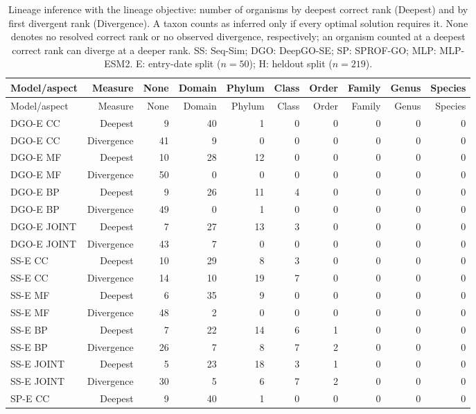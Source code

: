 \begingroup\scriptsize
\setlength{\tabcolsep}{4pt}
\begin{longtable}{lrrrrrrrrr}
\caption{Lineage inference with the lineage objective: number of organisms by deepest correct rank (Deepest) and by first divergent rank (Divergence). A taxon counts as inferred only if every optimal solution requires it. None denotes no resolved correct rank or no observed divergence, respectively; an organism counted at a deepest correct rank can diverge at a deeper rank. SS: Seq-Sim; DGO: DeepGO-SE; SP: SPROF-GO; MLP: MLP-ESM2. E: entry-date split ($n=50$); H: heldout split ($n=219$).}\label{tab:supp-lineage}\\
\toprule
Model/aspect & Measure & None & Domain & Phylum & Class & Order & Family & Genus & Species \\
\midrule
\endfirsthead
\toprule
Model/aspect & Measure & None & Domain & Phylum & Class & Order & Family & Genus & Species \\
\midrule
\endhead
DGO-E CC & Deepest & 9 & 40 & 1 & 0 & 0 & 0 & 0 & 0 \\
DGO-E CC & Divergence & 41 & 9 & 0 & 0 & 0 & 0 & 0 & 0 \\
DGO-E MF & Deepest & 10 & 28 & 12 & 0 & 0 & 0 & 0 & 0 \\
DGO-E MF & Divergence & 50 & 0 & 0 & 0 & 0 & 0 & 0 & 0 \\
DGO-E BP & Deepest & 9 & 26 & 11 & 4 & 0 & 0 & 0 & 0 \\
DGO-E BP & Divergence & 49 & 0 & 1 & 0 & 0 & 0 & 0 & 0 \\
DGO-E JOINT & Deepest & 7 & 27 & 13 & 3 & 0 & 0 & 0 & 0 \\
DGO-E JOINT & Divergence & 43 & 7 & 0 & 0 & 0 & 0 & 0 & 0 \\
SS-E CC & Deepest & 10 & 29 & 8 & 3 & 0 & 0 & 0 & 0 \\
SS-E CC & Divergence & 14 & 10 & 19 & 7 & 0 & 0 & 0 & 0 \\
SS-E MF & Deepest & 6 & 35 & 9 & 0 & 0 & 0 & 0 & 0 \\
SS-E MF & Divergence & 48 & 2 & 0 & 0 & 0 & 0 & 0 & 0 \\
SS-E BP & Deepest & 7 & 22 & 14 & 6 & 1 & 0 & 0 & 0 \\
SS-E BP & Divergence & 26 & 7 & 8 & 7 & 2 & 0 & 0 & 0 \\
SS-E JOINT & Deepest & 5 & 23 & 18 & 3 & 1 & 0 & 0 & 0 \\
SS-E JOINT & Divergence & 30 & 5 & 6 & 7 & 2 & 0 & 0 & 0 \\
SP-E CC & Deepest & 9 & 40 & 1 & 0 & 0 & 0 & 0 & 0 \\

\end{longtable}
